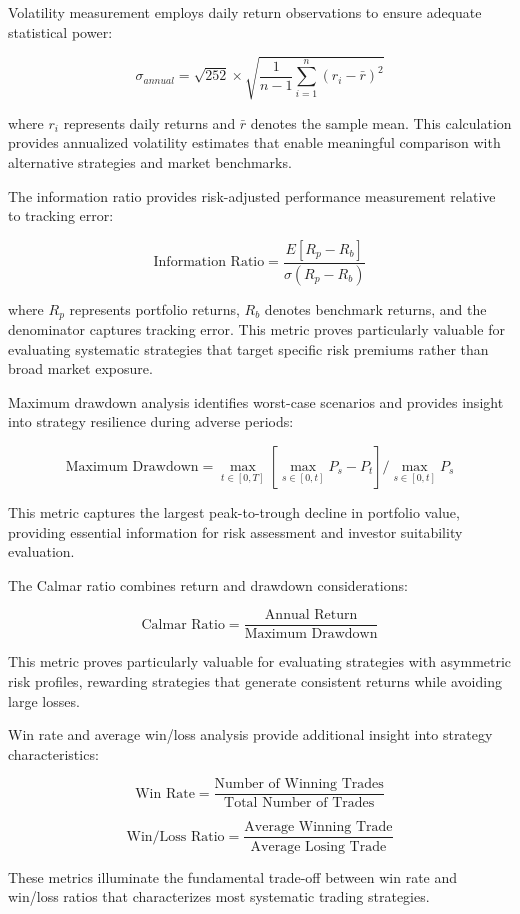 \documentclass[
  american,
  11pt,
  11pt,
  letterpaper,
  onecolumn]{article}
\begin{document}
Volatility measurement employs daily return observations to ensure
adequate statistical power:

\[\sigma_{annual} = \sqrt{252} \times \sqrt{\frac{1}{n-1}\sum_{i=1}^{n}(r_i - \bar{r})^2}\]

where \(r_i\) represents daily returns and \(\bar{r}\) denotes the
sample mean. This calculation provides annualized volatility estimates
that enable meaningful comparison with alternative strategies and market
benchmarks.

The information ratio provides risk-adjusted performance measurement
relative to tracking error:

\[\text{Information Ratio} = \frac{E[R_p - R_b]}{\sigma(R_p - R_b)}\]

where \(R_p\) represents portfolio returns, \(R_b\) denotes benchmark
returns, and the denominator captures tracking error. This metric proves
particularly valuable for evaluating systematic strategies that target
specific risk premiums rather than broad market exposure.

Maximum drawdown analysis identifies worst-case scenarios and provides
insight into strategy resilience during adverse periods:

\[\text{Maximum Drawdown} = \max_{t \in [0,T]} \left[\max_{s \in [0,t]} P_s - P_t\right] / \max_{s \in [0,t]} P_s\]

This metric captures the largest peak-to-trough decline in portfolio
value, providing essential information for risk assessment and investor
suitability evaluation.

The Calmar ratio combines return and drawdown considerations:

\[\text{Calmar Ratio} = \frac{\text{Annual Return}}{\text{Maximum Drawdown}}\]

This metric proves particularly valuable for evaluating strategies with
asymmetric risk profiles, rewarding strategies that generate consistent
returns while avoiding large losses.

Win rate and average win/loss analysis provide additional insight into
strategy characteristics:

\[\text{Win Rate} = \frac{\text{Number of Winning Trades}}{\text{Total Number of Trades}}\]

\[\text{Win/Loss Ratio} = \frac{\text{Average Winning Trade}}{\text{Average Losing Trade}}\]

These metrics illuminate the fundamental trade-off between win rate and
win/loss ratios that characterizes most systematic trading strategies.
\end{document}
